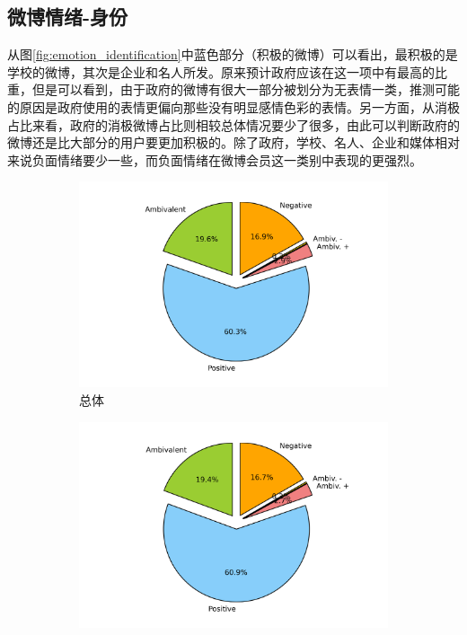 \documentclass[12pt, oneside]{article}
\begin{document}
\begin{spacing}{1.5}
\begin{CJK}{UTF8}{gbsn}
\subsection{微博情绪-身份}
从图\ref{fig:emotion_identification}中蓝色部分（积极的微博）可以看出，最积极的是学校的微博，其次是企业和名人所发。原来预计政府应该在这一项中有最高的比重，但是可以看到，由于政府的微博有很大一部分被划分为无表情一类，推测可能的原因是政府使用的表情更偏向那些没有明显感情色彩的表情。另一方面，从消极占比来看，政府的消极微博占比则相较总体情况要少了很多，由此可以判断政府的微博还是比大部分的用户要更加积极的。除了政府，学校、名人、企业和媒体相对来说负面情绪要少一些，而负面情绪在微博会员这一类别中表现的更强烈。

\begin{figure}
	\centering
	\begin{subfigure}[b]{0.3\linewidth}
		\centering
		\includegraphics[trim = 1.5cm 0 1.5cm 0, clip = true, width=\textwidth]{../result/charts/emotion_identification_all}
		\caption{总体}
	\end{subfigure}
	\begin{subfigure}[b]{0.3\linewidth}
		\centering
		\includegraphics[trim = 1.5cm 0 1.5cm 0, clip = true, width=\textwidth]{../result/charts/emotion_identification_ordinary}

\end{subfigure}
\end{figure}
\end{CJK}
\end{spacing}
\end{document}
